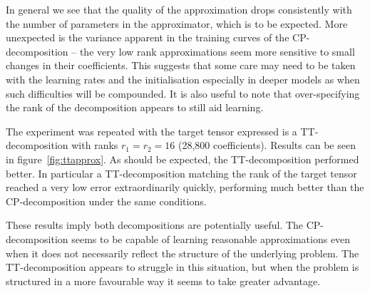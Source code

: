 {In general we see that the quality of the approximation drops consistently with the
number of parameters in the approximator, which is to be expected. 
More unexpected is the variance apparent in the training
curves of the CP-decomposition -- the very low rank approximations seem more sensitive to small
 changes in their coefficients. This suggests that some care
may need to be taken with the learning rates and the initialisation especially in deeper models as
when such difficulties will be compounded.
It is also useful to note that over-specifying the rank of the decomposition
appears to still aid learning.


The experiment was repeated with the target tensor expressed is a TT-decomposition with ranks
\(r_1 = r_2 = 16\) (28,800 coefficients). Results can be seen in figure~\ref{fig:ttapprox}.
As should be expected, the TT-decomposition performed better. In particular a TT-decomposition
matching the rank of the target tensor reached a very low error extraordinarily quickly,
performing much better than the CP-decomposition under the same conditions.

These results imply both decompositions are potentially useful. The CP-decomposition seems to
be capable of learning reasonable approximations even when it does not necessarily reflect the
structure of the underlying problem. The TT-decomposition appears to struggle in this situation,
but when the problem is structured in a more favourable way it seems to take greater advantage.

}
